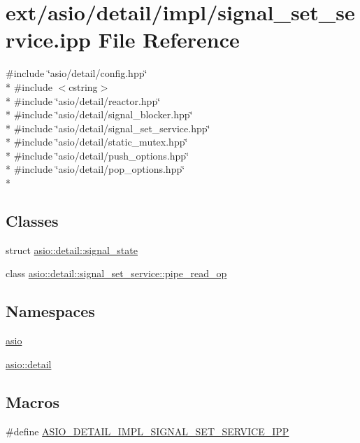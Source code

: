 \hypertarget{signal__set__service_8ipp}{}\section{ext/asio/detail/impl/signal\+\_\+set\+\_\+service.ipp File Reference}
\label{signal__set__service_8ipp}
{\ttfamily \#include \char`\"{}asio/detail/config.\+hpp\char`\"{}}\\*
{\ttfamily \#include $<$cstring$>$}\\*
{\ttfamily \#include \char`\"{}asio/detail/reactor.\+hpp\char`\"{}}\\*
{\ttfamily \#include \char`\"{}asio/detail/signal\+\_\+blocker.\+hpp\char`\"{}}\\*
{\ttfamily \#include \char`\"{}asio/detail/signal\+\_\+set\+\_\+service.\+hpp\char`\"{}}\\*
{\ttfamily \#include \char`\"{}asio/detail/static\+\_\+mutex.\+hpp\char`\"{}}\\*
{\ttfamily \#include \char`\"{}asio/detail/push\+\_\+options.\+hpp\char`\"{}}\\*
{\ttfamily \#include \char`\"{}asio/detail/pop\+\_\+options.\+hpp\char`\"{}}\\*
\subsection*{Classes}
\begin{DoxyCompactItemize}
\item 
struct \hyperlink{structasio_1_1detail_1_1signal__state}{asio\+::detail\+::signal\+\_\+state}
\item 
class \hyperlink{classasio_1_1detail_1_1signal__set__service_1_1pipe__read__op}{asio\+::detail\+::signal\+\_\+set\+\_\+service\+::pipe\+\_\+read\+\_\+op}
\end{DoxyCompactItemize}
\subsection*{Namespaces}
\begin{DoxyCompactItemize}
\item 
 \hyperlink{namespaceasio}{asio}
\item 
 \hyperlink{namespaceasio_1_1detail}{asio\+::detail}
\end{DoxyCompactItemize}
\subsection*{Macros}
\begin{DoxyCompactItemize}
\item 
\#define \hyperlink{signal__set__service_8ipp_a611cdd9865cee1cab10b78ba4d7d31c3}{A\+S\+I\+O\+\_\+\+D\+E\+T\+A\+I\+L\+\_\+\+I\+M\+P\+L\+\_\+\+S\+I\+G\+N\+A\+L\+\_\+\+S\+E\+T\+\_\+\+S\+E\+R\+V\+I\+C\+E\+\_\+\+I\+P\+P}
\end{DoxyCompactItemize}
